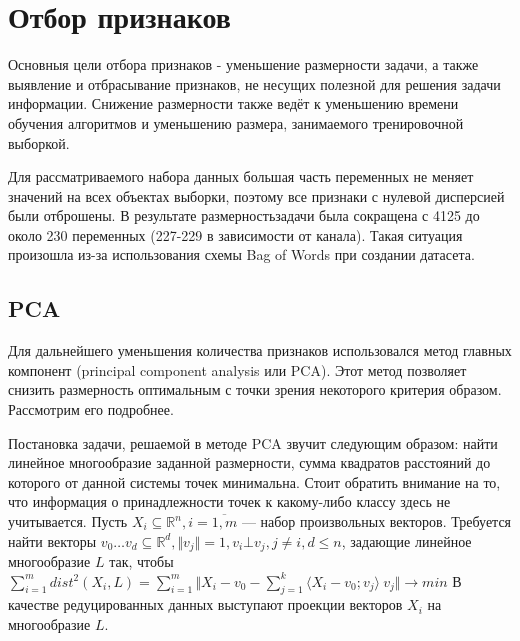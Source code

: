 \section{Отбор признаков}

\begin{Отбор признаков}
Основныя цели отбора признаков - уменьшение размерности задачи, а также выявление и отбрасывание признаков,
 не несущих полезной для решения задачи информации. Снижение размерности также ведёт к уменьшению времени обучения алгоритмов и уменьшению размера, занимаемого тренировочной выборкой.
 \par
Для рассматриваемого набора данных большая часть переменных не меняет значений на всех объектах выборки,
 поэтому все признаки с нулевой дисперсией были отброшены. В результате размерностьзадачи была сокращена
 с 4125 до около 230 переменных (227-229 в зависимости от канала). Такая ситуация произошла из-за использования схемы Bag of Words при создании датасета. 
 \subsection{PCA}
 \begin{PCA}
 Для дальнейшего уменьшения количества признаков использовался метод главных компонент
 (principal component analysis или PCA). Этот метод позволяет снизить размерность оптимальным с точки зрения некоторого критерия образом. Рассмотрим его подробнее.
 \par
 Постановка задачи, решаемой в методе PCA звучит следующим образом: найти линейное многообразие заданной 
 размерности, сумма квадратов расстояний до которого от данной системы точек минимальна. Стоит обратить внимание на то, что информация о принадлежности точек к какому-либо классу здесь не учитывается.
 Пусть \( X_i \subseteq \mathbb{R}^n, i=\overline{1,m} \) --- набор произвольных векторов. Требуется найти векторы \(v_0\ldots v_d\subseteq \mathbb{R}^d, \Vert v_j \Vert = 1, v_i \bot v_j, j \neq  i, d \leq n\), задающие линейное многообразие \(L\) так, чтобы \(
 \sum_{i=1}^{m} dist^2(X_i, L) = \sum_{i=1}^{m}\Vert X_i - v_0 - \sum_{j=1}^k\langle X_i - v_0; v_j\rangle\ v_j \Vert\rightarrow min\) В качестве редуцированных данных выступают проекции векторов \( X_i\) на многообразие \(L\). 
 
 
 

\end{PCA}
\end{Отбор признаков}
